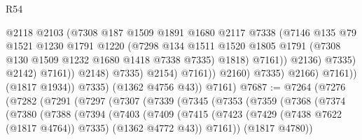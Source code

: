 \begin{lexlean}{R54}
\begin{coremodule}
                                          @2118
                                          @2103
                                          (@7308
                                            @187
                                            @1509
                                            @1891
                                            @1680
                                            @2117
                                            @7338
                                            (@7146
                                              @135
                                              @79
                                              @1521
                                              @1230
                                              @1791
                                              @1220
                                              (@7298
                                                @134
                                                @1511
                                                @1520
                                                @1805
                                                @1791
                                                (@7308 @130 @1509 @1232 @1680 @1418 @7338 @7335)
                                                @1818)
                                              @7161))
                                          @2136)
                                        @7335)
                                      @2142)
                                    @7161))
                                @2148)
                              @7335)
                            @2154)
                          @7161))
                      @2160)
                    @7335)
                  @2166)
                @7161))
            (@1817 @1934))
          @7335)
        (@1362 @4756 @43))
      @7161)
@7687 := @7264
    (@7276
      (@7282
        (@7291
          (@7297
            (@7307
              (@7339
                (@7345
                  (@7353
                    (@7359
                      (@7368
                        (@7374
                          (@7380
                            (@7388
                              (@7394
                                (@7403
                                  (@7409
                                    (@7415
                                      (@7423
                                        (@7429 (@7438 @7622 (@1817 @4764)) @7335)
                                        (@1362 @4772 @43))
                                      @7161))
                                  (@1817 @4780))

\end{coremodule}
\end{lexlean}
